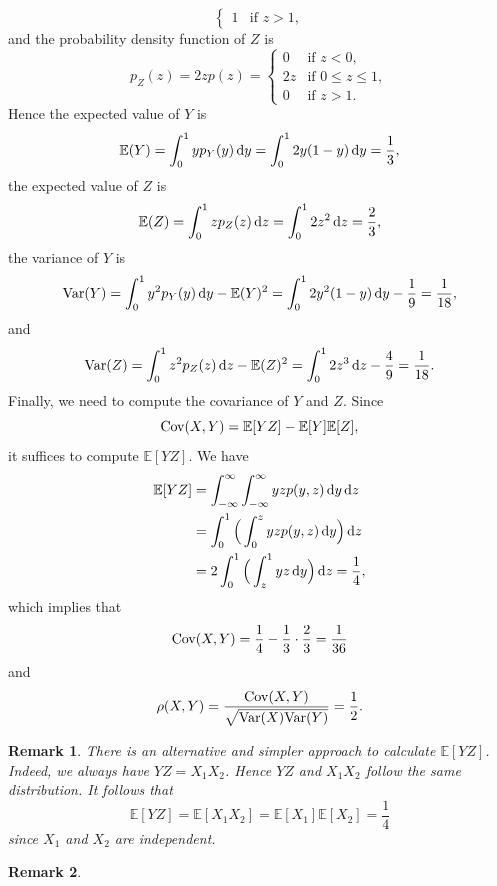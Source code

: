 \documentclass[12pt,letterpaper, onecolumn]{exam}
\newtheorem{remark}{Remark}
\begin{document}
\begin{questions}
\begin{solution}
$$\begin{cases}
                1&\text{if $z>1$},
            \end{cases}$$
            and the probability density function of $Z$ is
            $$p_Z(z)=2zp(z)=\begin{cases}
                0&\text{if $z<0$},\\
                2z&\text{if $0\le z\le 1$},\\
                0&\text{if $z>1$}.
            \end{cases}$$
            Hence the expected value of $Y$ is
            $$\mathbb{E}(Y)=\int_0^1yp_Y(y)\,{\rm{d}}y=\int_0^12y(1-y)\,{\rm{d}}y=\frac{1}{3},$$
            the expected value of $Z$ is
            $$\mathbb{E}(Z)=\int_0^1zp_Z(z)\,{\rm{d}}z=\int_0^12z^2\,{\rm{d}}z=\frac{2}{3},$$
            the variance of $Y$ is
            $$\text{Var}(Y)=\int_0^1y^2p_Y(y)\,{\rm{d}}y-\mathbb{E}(Y)^2=\int_0^12y^2(1-y)\,{\rm{d}}y-\frac{1}{9}=\frac{1}{18},$$
            and 
            $$\text{Var}(Z)=\int_0^1z^2p_Z(z)\,{\rm{d}}z-\mathbb{E}(Z)^2=\int_0^12z^3\,{\rm{d}}z-\frac{4}{9}=\frac{1}{18}.$$
            \quad Finally, we need to compute the covariance of $Y$ and $Z$. Since 
            $${\rm{Cov}}(X,Y)=\mathbb{E}[YZ]-\mathbb{E}[Y]\mathbb{E}[Z],$$
            it suffices to compute $\mathbb{E}[YZ]$. We have 
            \begin{align*}
                \mathbb{E}[YZ]&=\int_{-\infty}^{\infty}\int_{-\infty}^{\infty}yzp(y,z)\,{\rm{d}}y\,{\rm{d}}z\\
                &=\int_0^1\Big(\int_0^zyzp(y,z)\,{\rm{d}}y\Big)\,{\rm{d}}z\\
                &=2\int_0^1\Big(\int_z^1yz\,{\rm{d}}y\Big)\,{\rm{d}}z=\frac{1}{4},
            \end{align*}
            which implies that 
            $${\rm{Cov}}(X,Y)=\frac{1}{4}-\frac{1}{3}\cdot\frac{2}{3}=\frac{1}{36}$$
            and 
            $$\rho(X,Y)=\frac{{\rm{Cov}}(X,Y)}{\sqrt{{\rm{Var}}(X){\rm{Var}}(Y)}}=\frac{1}{2}.$$
        \end{solution}
        \begin{remark}
            There is an alternative and simpler approach to calculate $\mathbb{E}[YZ]$. Indeed, we always have $YZ=X_1X_2$. Hence $YZ$ and $X_1X_2$ follow the same distribution. It follows that
            $$\mathbb{E}[YZ]=\mathbb{E}[X_1X_2]=\mathbb{E}[X_1]\mathbb{E}[X_2]=\frac{1}{4}$$
            since $X_1$ and $X_2$ are independent.
        \end{remark}
        \begin{remark}

\end{remark}
\end{questions}
\end{document}
